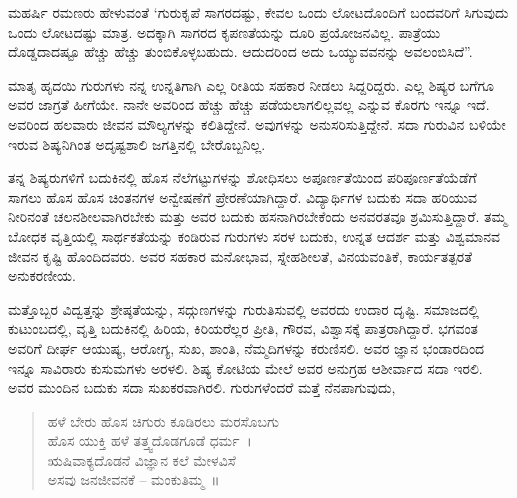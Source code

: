 ಮಹರ್ಷಿ ರಮಣರು ಹೇಳುವಂತೆ ‘ಗುರುಕೃಪೆ ಸಾಗರದಷ್ಟು, ಕೇವಲ ಒಂದು ಲೋಟದೊಂದಿಗೆ ಬಂದವರಿಗೆ ಸಿಗುವುದು ಒಂದು ಲೋಟದಷ್ಟು ಮಾತ್ರ. ಅದಕ್ಕಾಗಿ ಸಾಗರದ ಕೃಪಣತೆಯನ್ನು ದೂರಿ ಪ್ರಯೋಜನವಿಲ್ಲ. ಪಾತ್ರೆಯು ದೊಡ್ಡದಾದಷ್ಟೂ ಹೆಚ್ಚು ಹೆಚ್ಚು ತುಂಬಿಕೊಳ್ಳಬಹುದು. ಆದುದರಿಂದ ಅದು ಒಯ್ಯುವವನನ್ನು ಅವಲಂಬಿಸಿದೆ”.

ಮಾತೃ ಹೃದಯಿ ಗುರುಗಳು ನನ್ನ ಉನ್ನತಿಗಾಗಿ ಎಲ್ಲ ರೀತಿಯ ಸಹಕಾರ ನೀಡಲು ಸಿದ್ದರಿದ್ದರು. ಎಲ್ಲ ಶಿಷ್ಯರ ಬಗೆಗೂ ಅವರ ಜಾಗ್ರತೆ ಹೀಗೆಯೇ. ನಾನೇ ಅವರಿಂದ ಹೆಚ್ಚು ಹೆಚ್ಚು ಪಡೆಯಲಾಗಲಿಲ್ಲವಲ್ಲ ಎನ್ನುವ ಕೊರಗು ಇನ್ನೂ ಇದೆ. ಅವರಿಂದ ಹಲವಾರು ಜೀವನ ಮೌಲ್ಯಗಳನ್ನು ಕಲಿತಿದ್ದೇನೆ. ಅವುಗಳನ್ನು ಅನುಸರಿಸುತ್ತಿದ್ದೇನೆ. ಸದಾ ಗುರುವಿನ ಬಳಿಯೇ ಇರುವ ಶಿಷ್ಯನಿಗಿಂತ ಅದೃಷ್ಟಶಾಲಿ ಜಗತ್ತಿನಲ್ಲಿ ಬೇರೊಬ್ಬನಿಲ್ಲ.

ತನ್ನ ಶಿಷ್ಯರುಗಳಿಗೆ ಬದುಕಿನಲ್ಲಿ ಹೊಸ ನೆಲೆಗಟ್ಟುಗಳನ್ನು ಶೋಧಿಸಲು ಅಪೂರ್ಣತೆಯಿಂದ ಪರಿಪೂರ್ಣತೆಯೆಡೆಗೆ ಸಾಗಲು ಹೊಸ ಹೊಸ ಚಿಂತನಗಳ ಅನ್ವೇಷಣೆಗೆ ಪ್ರೇರಣೆಯಾಗಿದ್ದಾರೆ. ವಿದ್ಯಾರ್ಥಿಗಳ ಬದುಕು ಸದಾ ಹರಿಯುವ ನೀರಿನಂತೆ ಚಲನಶೀಲವಾಗಿರಬೇಕು ಮತ್ತು ಅವರ ಬದುಕು ಹಸನಾಗಿರಬೇಕೆಂದು ಅನವರತವೂ ಶ್ರಮಿಸುತ್ತಿದ್ದಾರೆ. ತಮ್ಮ ಬೋಧಕ ವೃತ್ತಿಯಲ್ಲಿ ಸಾರ್ಥಕತೆಯನ್ನು ಕಂಡಿರುವ ಗುರುಗಳು ಸರಳ ಬದುಕು, ಉನ್ನತ ಆದರ್ಶ ಮತ್ತು ವಿಶ್ವಮಾನವ ಜೀವನ ಕೃಷ್ಟಿ ಹೊಂದಿದವರು. ಅವರ ಸಹಕಾರ ಮನೋಭಾವ, ಸ್ನೇಹಶೀಲತೆ, ವಿನಯವಂತಿಕೆ, ಕಾರ್ಯತತ್ಪರತೆ ಅನುಕರಣೀಯ.

ಮತ್ತೊಬ್ಬರ ವಿದ್ವತ್ತನ್ನು ಶ್ರೇಷ್ಠತೆಯನ್ನು, ಸದ್ಗುಣಗಳನ್ನು ಗುರುತಿಸುವಲ್ಲಿ ಅವರದು ಉದಾರ ದೃಷ್ಟಿ. ಸಮಾಜದಲ್ಲಿ ಕುಟುಂಬದಲ್ಲಿ, ವೃತ್ತಿ ಬದುಕಿನಲ್ಲಿ ಹಿರಿಯ, ಕಿರಿಯರೆಲ್ಲರ ಪ್ರೀತಿ, ಗೌರವ, ವಿಶ್ವಾಸಕ್ಕೆ ಪಾತ್ರರಾಗಿದ್ದಾರೆ. ಭಗವಂತ ಅವರಿಗೆ ದೀರ್ಘ ಆಯುಷ್ಯ, ಆರೋಗ್ಯ, ಸುಖ, ಶಾಂತಿ, ನೆಮ್ಮದಿಗಳನ್ನು ಕರುಣಿಸಲಿ. ಅವರ ಜ್ಞಾನ ಭಂಡಾರದಿಂದ ಇನ್ನೂ ಸಾವಿರಾರು ಕುಸುಮಗಳು ಅರಳಲಿ. ಶಿಷ್ಯ ಕೋಟಿಯ ಮೇಲೆ ಅವರ ಅನುಗ್ರಹ ಆಶೀರ್ವಾದ ಸದಾ ಇರಲಿ. ಅವರ ಮುಂದಿನ ಬದುಕು ಸದಾ ಸುಖಕರವಾಗಿರಲಿ. ಗುರುಗಳೆಂದರೆ ಮತ್ತೆ ನೆನಪಾಗುವುದು,
\begin{verse}
ಹಳೆ ಬೇರು ಹೊಸ ಚಿಗುರು ಕೂಡಿರಲು ಮರಸೊಬಗು\\
ಹೊಸ ಯುಕ್ತಿ ಹಳೆ ತತ್ತ್ವದೊಡಗೂಡೆ ಧರ್ಮ~।\\
ಋಷಿವಾಕ್ಯದೊಡನೆ ವಿಜ್ಞಾನ ಕಲೆ ಮೇಳವಿಸೆ \\
ಅಸವು ಜನಜೀವನಕೆ – ಮಂಕುತಿಮ್ಮ~॥
\end{verse}

\articleend
